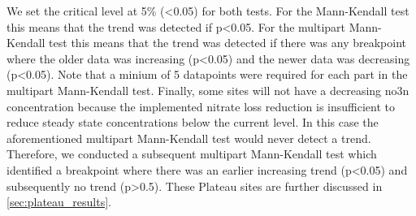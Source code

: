 We set the critical level at 5\% (<0.05) for both tests.
For the Mann-Kendall test this means that the trend was detected if p<0.05. For the multipart Mann-Kendall test this means that the trend was detected if there was any breakpoint where the older data was increasing (p<0.05) and the newer data was decreasing (p<0.05).
Note that a minium of 5 datapoints were required for each part in the multipart Mann-Kendall test.
Finally, some sites will not have a decreasing \gls{no3n} concentration because the implemented nitrate loss reduction is insufficient to reduce steady state concentrations below the current level.
In this case the aforementioned multipart Mann-Kendall test would never detect a trend.
Therefore, we conducted a subsequent multipart Mann-Kendall test which identified a breakpoint where there was an earlier increasing trend (p<0.05) and subsequently no trend (p>0.5). These Plateau sites are further discussed in \autoref{sec:plateau_results}.

